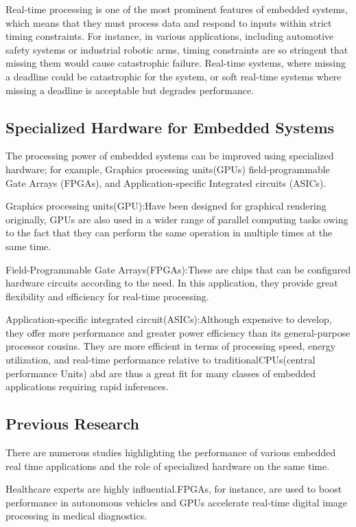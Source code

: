 \documentclass{article}
\begin{document}
Real-time processing is one of the most prominent features of embedded systems, which
means that they must process data and respond to inputs within strict timing constraints. For
instance, in various applications, including automotive safety systems or industrial robotic
arms, timing constraints are so stringent that missing them would cause catastrophic failure.
Real-time systems, where missing a deadline could be catastrophic for the system, or soft
real-time systems where missing a deadline is acceptable but degrades performance.

\subsection{Specialized Hardware for Embedded Systems}
The processing power of embedded systems can be improved using specialized hardware;
for example, Graphics processing units(GPUs) field-programmable Gate Arrays (FPGAs),
and Application-specific Integrated circuits (ASICs).

Graphics processing units(GPU):Have been designed for graphical rendering originally,
GPUs are also used in a wider range of parallel computing tasks owing to the fact that they
can perform the same operation in multiple times at the same time.

Field-Programmable Gate Arrays(FPGAs):These are chips that can be configured hardware circuits according to the need. In
this application, they provide great flexibility and efficiency for real-time processing.

Application-specific integrated circuit(ASICs):Although expensive to develop, they
offer more performance and greater power efficiency than its general-purpose processor
cousins.
They are more efficient in terms of processing speed, energy utilization, and real-time
performance relative to traditionalCPUs(central performance Units) abd are thus a great fit
for many classes of embedded applications requiring rapid inferences.

\subsection{Previous Research}
There are numerous studies highlighting the performance of various embedded real
time
applications and the role of specialized hardware on the same time.

Healthcare experts are
highly influential.FPGAs, for instance, are used to boost performance in autonomous
vehicles and GPUs accelerate real-time digital image processing in medical diagnostics.
\end{document}
